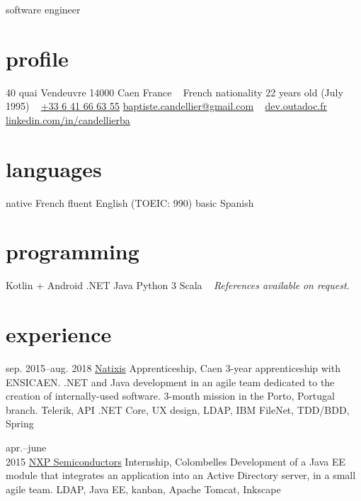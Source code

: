 \documentclass[]{friggeri-cv}
\begin{document}
{software engineer}

\begin{aside}
    \section{profile}
    40 quai Vendeuvre
    14000 Caen
    France
    ~
    French nationality
    22 years old (July 1995)
    ~
    \href{tel:0033641666355}{+33 6 41 66 63 55}
    \href{mailto:baptiste.candellier@gmail.com}{baptiste.candellier@gmail.com}
    ~
    {\href{https://dev.outadoc.fr}{dev.outadoc.fr}}
    {\href{https://www.linkedin.com/in/candellierba/}{linkedin.com/in/candellierba}}
    \section{languages}
    native French
    fluent English (TOEIC: 990)
    basic Spanish
    \section{programming}
    Kotlin + Android 
    \csharp{} .NET 
    Java 
    Python 3 
    Scala 
    ~
    \textit{References available}
    \textit{on request.}
    \restorecr 
    \obeycr
\end{aside}

\section{experience}

\begin{entrylist}
    \entry
	{sep. 2015--aug. 2018}
    {\href{https://www.natixis.com}{Natixis}}
    {Apprenticeship, Caen}
    {3-year apprenticeship with ENSICAEN. \csharp .NET and Java development in an agile team dedicated to the creation of internally-used software. 3-month mission in the Porto, Portugal branch.}
    {Telerik, API .NET Core, UX design, LDAP, IBM FileNet, TDD/BDD, Spring}
    
    \entry
    {apr.--june\\2015}
    {\href{https://www.nxp.com}{NXP Semiconductors}}
    {Internship, Colombelles}
    {Development of a Java EE module that integrates an application into an Active Directory server, in a small agile team.}
    {LDAP, Java EE, kanban, Apache Tomcat, Inkscape}
\end{entrylist}
\end{document}

